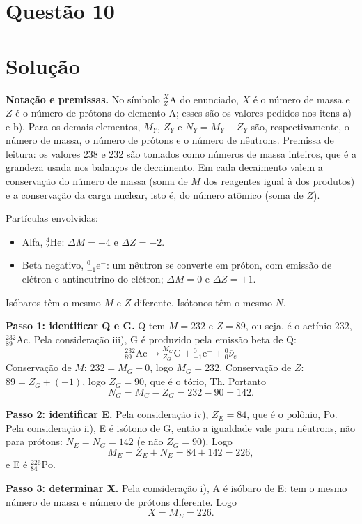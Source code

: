 \documentclass{article}%
\begin{document}
\section*{Questão 10}

\section*{Solução}

\textbf{Notação e premissas.} No símbolo ${}^{X}_{Z}\mathrm{A}$ do enunciado, $X$ é o número de massa e $Z$ é o número de prótons do elemento A; esses são os valores pedidos nos itens a) e b). Para os demais elementos, $M_Y$, $Z_Y$ e $N_Y = M_Y - Z_Y$ são, respectivamente, o número de massa, o número de prótons e o número de nêutrons. Premissa de leitura: os valores 238 e 232 são tomados como números de massa inteiros, que é a grandeza usada nos balanços de decaimento. Em cada decaimento valem a conservação do número de massa (soma de $M$ dos reagentes igual à dos produtos) e a conservação da carga nuclear, isto é, do número atômico (soma de $Z$).

Partículas envolvidas:
\begin{itemize}
\item Alfa, ${}^{4}_{2}\mathrm{He}$: $\Delta M = -4$ e $\Delta Z = -2$.
\item Beta negativo, ${}^{0}_{-1}\mathrm{e}^{-}$: um nêutron se converte em próton, com emissão de elétron e antineutrino do elétron; $\Delta M = 0$ e $\Delta Z = +1$.
\end{itemize}
Isóbaros têm o mesmo $M$ e $Z$ diferente. Isótonos têm o mesmo $N$.

\textbf{Passo 1: identificar Q e G.} Q tem $M = 232$ e $Z = 89$, ou seja, é o actínio-232, ${}^{232}_{89}\mathrm{Ac}$. Pela consideração iii), G é produzido pela emissão beta de Q:
\[
{}^{232}_{89}\mathrm{Ac} \longrightarrow {}^{M_G}_{Z_G}\mathrm{G} + {}^{0}_{-1}\mathrm{e}^{-} + {}^{0}_{0}\overline{\nu}_{e}
\]
Conservação de $M$: $232 = M_G + 0$, logo $M_G = 232$. Conservação de $Z$: $89 = Z_G + (-1)$, logo $Z_G = 90$, que é o tório, Th. Portanto
\[
N_G = M_G - Z_G = 232 - 90 = 142.
\]

\textbf{Passo 2: identificar E.} Pela consideração iv), $Z_E = 84$, que é o polônio, Po. Pela consideração ii), E é isótono de G, então a igualdade vale para nêutrons, não para prótons: $N_E = N_G = 142$ (e não $Z_G = 90$). Logo
\[
M_E = Z_E + N_E = 84 + 142 = 226,
\]
e E é ${}^{226}_{84}\mathrm{Po}$.

\textbf{Passo 3: determinar X.} Pela consideração i), A é isóbaro de E: tem o mesmo número de massa e número de prótons diferente. Logo
\[
X = M_E = 226.
\]
\end{document}
